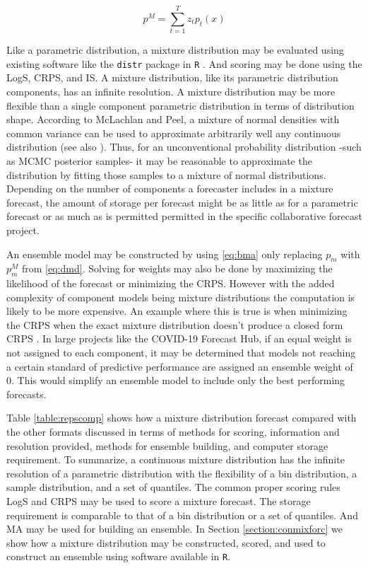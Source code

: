 \documentclass[11pt,notitlepage]{isuthesis}
\begin{document}
\begin{equation}
\label{eq:dmd}
  p^{M} = \sum_{t=1}^T z_tp_t(x)
\end{equation}




Like a parametric distribution, a mixture distribution may be evaluated using
existing software like the \texttt{distr} package in \texttt{R} 
\cite[]{camphausen2007distr}. 
And 
scoring may be done  
using the LogS, CRPS, and IS. A mixture distribution, like its parametric 
distribution components, has an infinite resolution.
A mixture distribution may be more flexible than a single component 
parametric distribution in 
terms of distribution shape. According to 
McLachlan and Peel, a mixture of 
normal densities with common variance can be used to approximate arbitrarily 
well
any continuous distribution \cite[]{peel2000finite} (see also 
\cite[]{nguyen2019approximations}). Thus, for an unconventional probability
distribution -such as MCMC posterior samples- it may be reasonable to 
approximate the distribution by fitting those samples to a mixture of normal
distributions.
Depending on the number of components a forecaster includes in a mixture 
forecast, the amount of storage per forecast might be as little as for a 
parametric forecast or as much as is permitted permitted in the specific 
collaborative forecast project. 

An ensemble model may be constructed by using \eqref{eq:bma} only replacing 
$p_m$
with $p_m^M$ from \eqref{eq:dmd}. Solving for weights may also be done by 
maximizing
the likelihood of the forecast or minimizing the CRPS. However with the 
added complexity of component models being mixture distributions the 
computation is likely to be more expensive. An example where this is
true is when minimizing the CRPS when the exact mixture distribution doesn't 
produce a closed form CRPS \cite[]{baran2018combining}. In large projects like
the COVID-19 Forecast Hub, if an equal weight is not assigned to each component,
it may be determined that models not reaching a certain standard of predictive
performance are
assigned an ensemble weight of 0. This would simplify an ensemble model to 
include only the best performing forecasts.



Table \ref{table:repscomp} shows how a mixture distribution forecast 
compared with the other formats discussed in terms of methods for scoring,
information and resolution provided, methods for ensemble building, and computer
storage requirement. To summarize, a continuous mixture distribution has the 
infinite resolution of a parametric distribution with the flexibility of a bin
distribution, a sample distribution, and a set of quantiles. The common proper
scoring rules LogS and CRPS may be used to score a mixture forecast. 
The storage requirement is
comparable to that of a bin distribution or a set of quantiles. And MA may be 
used for building an ensemble.
In Section
\ref{section:conmixforc} we show how a mixture distribution may be constructed,
scored, and used to construct an ensemble using software available in 
\texttt{R}.
\end{document}

